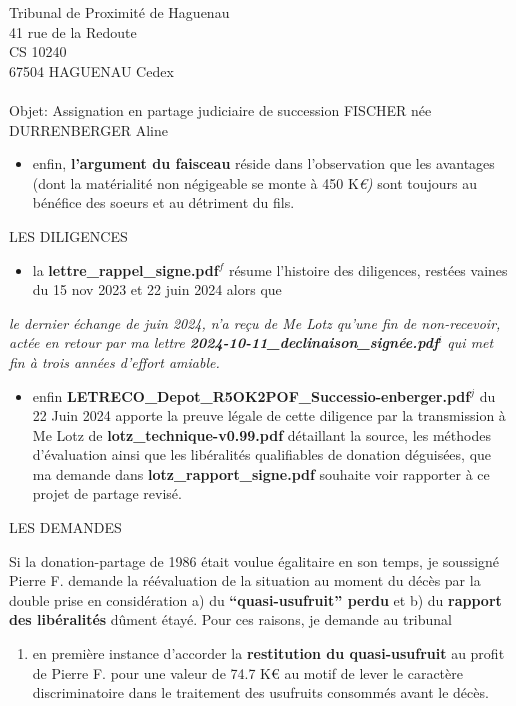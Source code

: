 \documentclass[
]{letter}
\providecommand{\tightlist}{%
  \setlength{\itemsep}{0pt}\setlength{\parskip}{0pt}}\usepackage{longtable,booktabs,array}
\begin{document}
\begin{letter}{Tribunal de Proximité de Haguenau\\41 rue de la
Redoute\\CS 10240\\67504 HAGUENAU Cedex\\ ~ \\Objet: Assignation en
partage judiciaire de succession FISCHER née DURRENBERGER Aline}
\begin{itemize}
\tightlist
\item
  enfin, \textbf{l'argument du faisceau} réside dans l'observation que
  les avantages (dont la matérialité non négigeable se monte à 450
  K\emph{€)} sont toujours au bénéfice des soeurs et au détriment du
  fils.
\end{itemize}

LES DILIGENCES

\begin{itemize}
\tightlist
\item
  la \textbf{lettre\_rappel\_signe.pdf}\(^f\) résume l'histoire des
  diligences, restées vaines du 15 nov 2023 et 22 juin 2024 alors que
\end{itemize}

\emph{le dernier échange de juin 2024, n'a reçu de Me Lotz qu'une fin de
non-recevoir, actée en retour par ma lettre
\textbf{2024-10-11\_declinaison\_signée.pdf}}\(^i\) \emph{qui met fin à
trois années d'effort amiable.}

\begin{itemize}
\tightlist
\item
  enfin \textbf{LETRECO\_Depot\_R5OK2POF\_Successio-enberger.pdf}\(^j\)
  du 22 Juin 2024 apporte la preuve légale de cette diligence par la
  transmission à Me Lotz de \textbf{lotz\_technique-v0.99.pdf}
  détaillant la source, les méthodes d'évaluation ainsi que les
  libéralités qualifiables de donation déguisées, que ma demande dans
  \textbf{lotz\_rapport\_signe.pdf} souhaite voir rapporter à ce projet
  de partage revisé.
\end{itemize}

LES DEMANDES

Si la donation-partage de 1986 était voulue égalitaire en son temps, je
soussigné Pierre F. demande la réévaluation de la situation au moment du
décès par la double prise en considération a) du
\textbf{``quasi-usufruit'' perdu} et b) du \textbf{rapport des
libéralités} dûment étayé. Pour ces raisons, je demande au tribunal

\begin{enumerate}
\def\labelenumi{\arabic{enumi}.}
\tightlist
\item
  en première instance d'accorder la \textbf{restitution du
  quasi-usufruit} au profit de Pierre F. pour une valeur de 74.7 K€ au
  motif de lever le caractère discriminatoire dans le traitement des
  usufruits consommés avant le décès.
\end{enumerate}


\end{letter}
\end{document}
